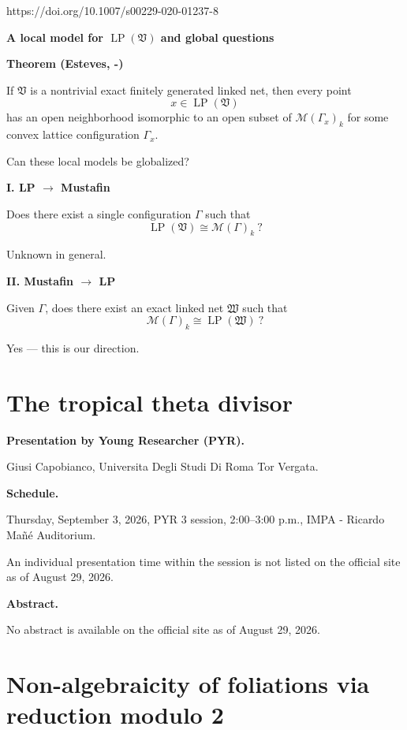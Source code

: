 https://doi.org/10.1007/s00229-020-01237-8

\medskip\noindent
{\bf A local model for
$\operatorname{LP}(\mathfrak{V})$ and
global questions}

\medskip\noindent
{\bf Theorem (Esteves, -)}

If $\mathfrak{V}$ is a nontrivial exact
finitely generated linked net, then every
point
$$
x\in\operatorname{LP}(\mathfrak{V})
$$
has an open neighborhood isomorphic to an
open subset of
$\mathcal{M}(\Gamma_x)_k$ for some convex
lattice configuration $\Gamma_x$.

\medskip\noindent
Can these local models be globalized?

\medskip\noindent
{\bf I. LP $\longrightarrow$ Mustafin}

Does there exist a single configuration
$\Gamma$ such that
$$
\operatorname{LP}(\mathfrak{V})
\cong\mathcal{M}(\Gamma)_k\ ?
$$

Unknown in general.

\medskip\noindent
{\bf II. Mustafin $\longrightarrow$ LP}

Given $\Gamma$, does there exist an exact
linked net $\mathfrak{W}$ such that
$$
\mathcal{M}(\Gamma)_k
\cong\operatorname{LP}(\mathfrak{W})\ ?
$$

Yes --- this is our direction.

\section{The tropical theta divisor}
\label{section-tropical-theta-divisor}

\medskip\noindent
{\bf Presentation by Young Researcher
(PYR).}

Giusi Capobianco,
Universita Degli Studi Di Roma Tor Vergata.

\medskip\noindent
{\bf Schedule.}

Thursday, September 3, 2026,
PYR 3 session, 2:00--3:00 p.m.,
IMPA - Ricardo Ma\~n\'e Auditorium.

An individual presentation time within
the session is not listed on the
official site as of August 29, 2026.

\medskip\noindent
{\bf Abstract.}

No abstract is available on the official
site as of August 29, 2026.

\section{Non-algebraicity of foliations via
reduction modulo 2}
\label{section-nonalgebraicity-foliations}

